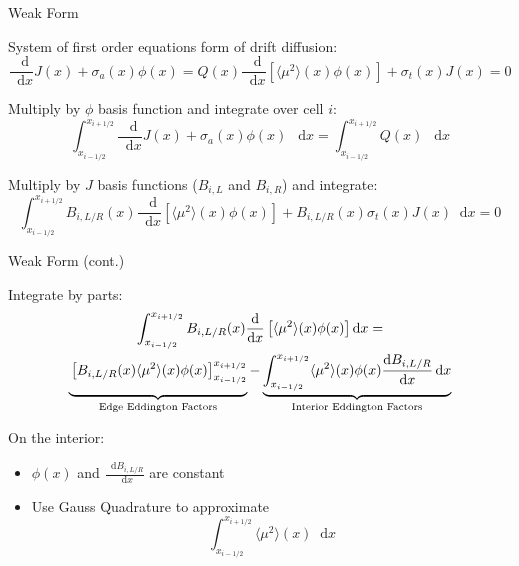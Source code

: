 \documentclass[10pt]{beamer}
\newcommand{\ud}{\mathop{}\!\mathrm{d}} %
\newcommand{\dderiv}[2]{\frac{\ud #1}{\ud #2}}
\newcommand{\edd}{\langle \mu^2 \rangle}
\newcommand{\bracket}[1]{\left[ #1 \right]}
\begin{document}
\begin{frame}{Weak Form}

	System of first order equations form of drift diffusion:
	\begin{subequations} 
	\begin{equation*} \label{eq:zero}
		\dderiv{}{x} J (x) + \sigma_a(x) \phi(x) = Q(x)
	\end{equation*} 
	\begin{equation*} \label{eq:first}
		\dderiv{}{x} \bracket{\edd(x) \phi (x)} + \sigma_t(x) J(x) = 0
	\end{equation*}
	\end{subequations}

	Multiply by $\phi$ basis function and integrate over cell $i$: 
	\begin{equation*}
		\int_{x_{i-1/2}}^{x_{i+1/2}} \dderiv{}{x} J (x) + \sigma_a(x) \phi(x) \ \ud x 
		= \int_{x_{i-1/2}}^{x_{i+1/2}} Q(x) \ \ud x
	\end{equation*}

	Multiply by $J$ basis functions ($B_{i,L}$ and $B_{i,R}$) and integrate: 
	\begin{equation*}
		\int_{x_{i-1/2}}^{x_{i+1/2}} 
		B_{i,L/R}(x)\dderiv{}{x} \bracket{\edd(x) \phi (x)} + B_{i,L/R}(x)\sigma_t(x) J(x) \ud x = 0
	\end{equation*}

	

\end{frame}

\begin{frame}{Weak Form (cont.)}

	Integrate by parts:
	\begin{multline*}
		\int_{x_{i-1/2}}^{x_{i+1/2}} 
			B_{i,L/R}(x)\dderiv{}{x} \bracket{\edd(x) \phi (x)} \ud x = \\ 
		\underbrace{\vphantom{\int_{x_{i-1/2}}}
		\bracket{B_{i,L/R}(x)\edd(x)\phi(x)}_{x_{i-1/2}}^{x_{i+1/2}}}_\text{Edge Eddington Factors}
		- 
		\underbrace{\int_{x_{i-1/2}}^{x_{i+1/2}}
		\edd(x) \phi(x) \dderiv{B_{i,L/R}}{x} \ud x}_\text{Interior Eddington Factors}
	\end{multline*}

	On the interior: 
	\begin{itemize}

		\item $\phi(x)$ and $\dderiv{B_{i,L/R}}{x}$ are constant 

		\item Use Gauss Quadrature to approximate 
		\begin{equation*}
			\int_{x_{i-1/2}}^{x_{i+1/2}} \edd(x) \ud x 
		\end{equation*}

	\end{itemize}

\end{frame}
\end{document}
